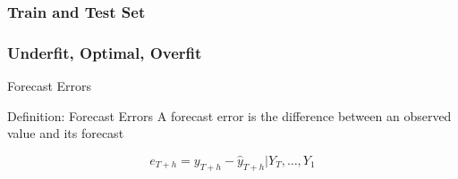 \documentclass{beamer}
\begin{document}
\begin{frame}
  \frametitle{Train and Test Set}
\end{frame}

\begin{frame}
  \frametitle{Underfit, Optimal, Overfit}
\end{frame}

\begin{frame}{Forecast Errors}

  \begin{block}{Definition: Forecast Errors}
    A forecast error is the difference between an observed value and its forecast

    \begin{equation*}
      e_{T+h} = y_{T+h} - \hat{y}_{T+h}|Y_T, \dots, Y_1
    \end{equation*}
  \end{block}
  
\end{frame}










\end{document}
